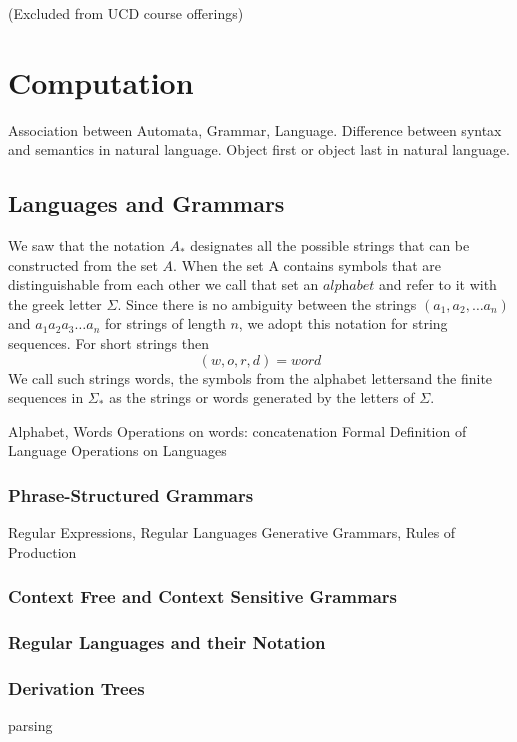 

                                                                 
(Excluded from UCD course offerings)
\chapter {Computation}
Association between Automata, Grammar, Language. Difference between syntax and semantics in natural language. Object first or object last in natural language. 

\section {Languages and Grammars}
We saw that the notation $A_*$ designates all the possible strings that can be constructed from the set $A$. When the set A contains symbols that are distinguishable from each other we call that set an $\textit{alphabet}$ and refer to it with the greek letter $\Sigma$. Since there is no ambiguity between the strings $(a_1,a_2, \dots a_n)$ and $a_1a_2a_3 \dots a_n$ for strings of length $n$, we adopt this notation for string sequences. For short strings then
$$(w,o,r,d) = word$$
We call such strings words, the symbols from the alphabet lettersand the finite sequences in $\Sigma_*$ as the strings or words generated by the letters of $\Sigma$.

Alphabet, Words
Operations on words: concatenation
Formal Definition of Language
Operations on Languages
    \subsection {Phrase-Structured Grammars}
Regular Expressions, Regular Languages
Generative Grammars, Rules of Production
    \subsection {Context Free and Context Sensitive Grammars}
    \subsection {Regular Languages and their Notation}
    \subsection {Derivation Trees}
    parsing
